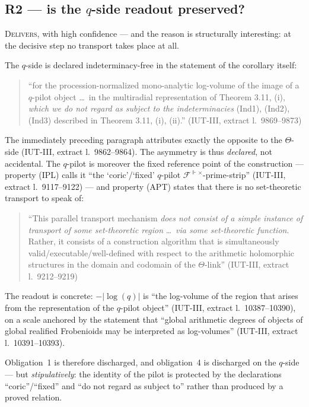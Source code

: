 \documentclass[11pt,a4paper]{article}
\theoremstyle{definition}
\newcommand{\anchor}[2]{(#1, extract l.~#2)}
\begin{document}
\subsection{R2 --- is the \texorpdfstring{$q$}{q}-side readout preserved?}

\textsc{Delivers}, with high confidence --- and the reason is structurally
interesting: at the decisive step no transport takes place at all.

The $q$-side is declared indeterminacy-free in the statement of the corollary
itself:

\begin{quote}\small
``for the procession-normalized mono-analytic log-volume of the image of a
$q$-pilot object \dots\ in the multiradial representation of Theorem 3.11, (i),
\emph{which we do not regard as subject to the indeterminacies} (Ind1), (Ind2),
(Ind3) described in Theorem 3.11, (i), (ii).''
\hfill\anchor{IUT-III}{9869--9873}
\end{quote}

The immediately preceding paragraph attributes exactly the opposite to the
$\Theta$-side \anchor{IUT-III}{9862--9864}. The asymmetry is thus \emph{declared},
not accidental. The $q$-pilot is moreover the fixed reference point of the
construction --- property (IPL) calls it ``the `coric'/`fixed' $q$-pilot
$\mathcal{F}^{\Vdash\times}$-prime-strip'' \anchor{IUT-III}{9117--9122} --- and
property (APT) states that there is no set-theoretic transport to speak of:

\begin{quote}\small
``This parallel transport mechanism \emph{does not consist of a simple instance of
transport of some set-theoretic region} \dots\ \emph{via some set-theoretic
function}. Rather, it consists of a construction algorithm that is simultaneously
valid/executable/well-defined with respect to the arithmetic holomorphic
structures in the domain and codomain of the $\Theta$-link''
\hfill\anchor{IUT-III}{9212--9219}
\end{quote}

The readout is concrete: $-|\log(q)|$ is ``the log-volume of the region that
arises from the representation of the $q$-pilot object''
\anchor{IUT-III}{10387--10390}, on a scale anchored by the statement that
``global arithmetic degrees of objects of global realified Frobenioids may be
interpreted as log-volumes'' \anchor{IUT-III}{10391--10393}.

Obligation~1 is therefore discharged, and obligation~4 is discharged on the
$q$-side --- but \emph{stipulatively}: the identity of the pilot is protected by
the declarations ``coric''/``fixed'' and ``do not regard as subject to'' rather
than produced by a proved relation.
\end{document}
